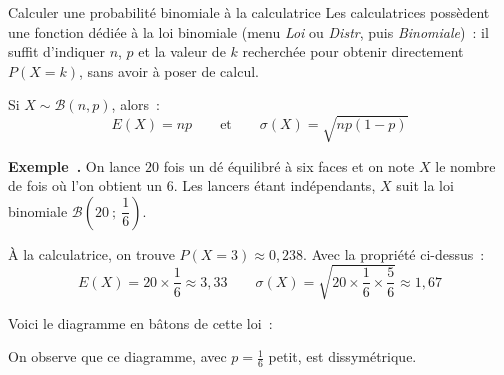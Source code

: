 \documentclass[11pt,a4paper]{article}
\newcounter{exemplenum}
\newcommand{\exnum}{\stepcounter{exemplenum}\textbf{Exemple~\theexemplenum.} }
\begin{document}
\begin{methode}{Calculer une probabilité binomiale à la calculatrice}
Les calculatrices possèdent une fonction dédiée à la loi binomiale (menu \textit{Loi} ou \textit{Distr}, puis \textit{Binomiale})~: il suffit d'indiquer $n$, $p$ et la valeur de $k$ recherchée pour obtenir directement $P(X=k)$, sans avoir à poser de calcul.
\end{methode}

\begin{propriete}
Si $X \sim \mathcal{B}(n,p)$, alors~:
$$E(X) = np \qquad \text{et} \qquad \sigma(X) = \sqrt{np(1-p)}$$
\end{propriete}

\begin{exemple}
\exnum On lance $20$ fois un dé équilibré à six faces et on note $X$ le nombre de fois où l'on obtient un $6$. Les lancers étant indépendants, $X$ suit la loi binomiale $\mathcal{B}\left(20~;~\dfrac{1}{6}\right)$.

À la calculatrice, on trouve $P(X=3) \approx 0{,}238$. Avec la propriété ci-dessus~:
$$E(X) = 20 \times \dfrac{1}{6} \approx 3{,}33 \qquad \sigma(X) = \sqrt{20 \times \dfrac{1}{6}\times\dfrac{5}{6}} \approx 1{,}67$$

Voici le diagramme en bâtons de cette loi~:

\begin{center}
\end{center}

On observe que ce diagramme, avec $p=\frac16$ petit, est dissymétrique.
\end{exemple}
\end{document}
